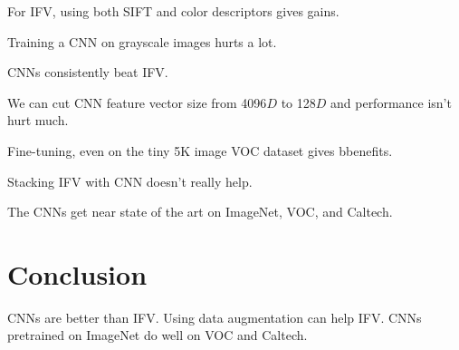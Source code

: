 \documentclass[a4paper]{article}
\begin{document}
For IFV, using both SIFT and color descriptors gives gains.

Training a CNN on grayscale images hurts a lot.

CNNs consistently beat IFV.

We can cut CNN feature vector size from 4096$D$ to 128$D$ and performance isn't
hurt much.

Fine-tuning, even on the tiny 5K image VOC dataset gives bbenefits.

Stacking IFV with CNN doesn't really help.

The CNNs get near state of the art on ImageNet, VOC, and Caltech.

\section{Conclusion}
CNNs are better than IFV. Using data augmentation can help IFV. CNNs pretrained
on ImageNet do well on VOC and Caltech.
\end{document}

